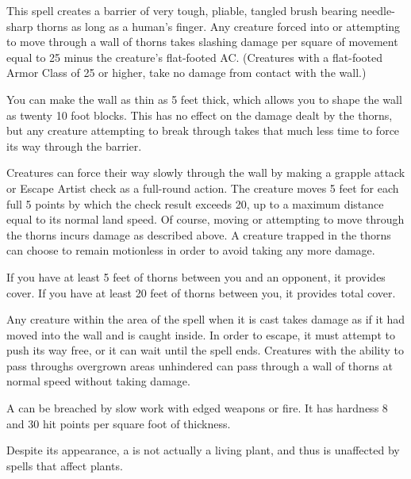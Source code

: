 \spellrng{\rngmed}
\begin{spelleffect}
  This spell creates a barrier of very tough, pliable, tangled brush bearing needle-sharp thorns as long as a human's finger. Any creature forced into or attempting to move through a wall of thorns takes slashing damage per square of movement equal to 25 minus the creature's flat-footed AC. (Creatures with a flat-footed Armor Class of 25 or higher, take no damage from contact with the wall.)
  \par You can make the wall as thin as 5 feet thick, which allows you to shape the wall as twenty 10 foot blocks. This has no effect on the damage dealt by the thorns, but any creature attempting to break through takes that much less time to force its way through the barrier.
  \par Creatures can force their way slowly through the wall by making a grapple attack or Escape Artist check as a full-round action. The creature moves 5 feet for each full 5 points by which the check result exceeds 20, up to a maximum distance equal to its normal land speed. Of course, moving or attempting to move through the thorns incurs damage as described above. A creature trapped in the thorns can choose to remain motionless in order to avoid taking any more damage.
  \par If you have at least 5 feet of thorns between you and an opponent, it provides cover. If you have at least 20 feet of thorns between you, it provides total cover.
  \par Any creature within the area of the spell when it is cast takes damage as if it had moved into the wall and is caught inside. In order to escape, it must attempt to push its way free, or it can wait until the spell ends. Creatures with the ability to pass throughs overgrown areas unhindered can pass through a wall of thorns at normal speed without taking damage.
\end{spelleffect}
\begin{spellnotes}
  A  can be breached by slow work with edged weapons or fire. It has hardness 8 and 30 hit points per square foot of thickness.
  \par Despite its appearance, a  is not actually a living plant, and thus is unaffected by spells that affect plants.
\end{spellnotes}

